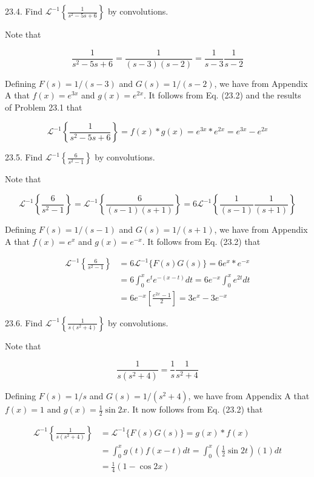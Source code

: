 \documentclass[10pt]{article}
\begin{document}
23.4. Find $\mathscr{L}^{-1}\left\{\frac{1}{s^{2}-5 s+6}\right\}$ by convolutions.

Note that

$$
\frac{1}{s^{2}-5 s+6}=\frac{1}{(s-3)(s-2)}=\frac{1}{s-3} \frac{1}{s-2}
$$

Defining $F(s)=1 /(s-3)$ and $G(s)=1 /(s-2)$, we have from Appendix A that $f(x)=e^{3 x}$ and $g(x)=e^{2 x}$. It follows from Eq. (23.2) and the results of Problem 23.1 that

$$
\mathscr{L}^{-1}\left\{\frac{1}{s^{2}-5 s+6}\right\}=f(x) * g(x)=e^{3 x} * e^{2 x}=e^{3 x}-e^{2 x}
$$

23.5. Find $\mathscr{L}^{-1}\left\{\frac{6}{s^{2}-1}\right\}$ by convolutions.

Note that

$$
\mathscr{L}^{-1}\left\{\frac{6}{s^{2}-1}\right\}=\mathscr{L}^{-1}\left\{\frac{6}{(s-1)(s+1)}\right\}=6 \mathscr{L}^{-1}\left\{\frac{1}{(s-1)} \frac{1}{(s+1)}\right\}
$$

Defining $F(s)=1 /(s-1)$ and $G(s)=1 /(s+1)$, we have from Appendix A that $f(x)=e^{x}$ and $g(x)=e^{-x}$. It follows from Eq. (23.2) that

$$
\begin{aligned}
\mathscr{L}^{-1}\left\{\frac{6}{s^{2}-1}\right\} & =6 \mathscr{L}^{-1}\{F(s) G(s)\}=6 e^{x} * e^{-x} \\
& =6 \int_{0}^{x} e^{t} e^{-(x-t)} d t=6 e^{-x} \int_{0}^{x} e^{2 t} d t \\
& =6 e^{-x}\left[\frac{e^{2 x}-1}{2}\right]=3 e^{x}-3 e^{-x}
\end{aligned}
$$

23.6. Find $\mathscr{L}^{-1}\left\{\frac{1}{s\left(s^{2}+4\right)}\right\}$ by convolutions.

Note that

$$
\frac{1}{s\left(s^{2}+4\right)}=\frac{1}{s} \frac{1}{s^{2}+4}
$$

Defining $F(s)=1 / s$ and $G(s)=1 /\left(s^{2}+4\right)$, we have from Appendix A that $f(x)=1$ and $g(x)=\frac{1}{2} \sin 2 x$. It now follows from Eq. (23.2) that

$$
\begin{aligned}
\mathscr{L}^{-1}\left\{\frac{1}{s\left(s^{2}+4\right)}\right\} & =\mathscr{L}^{-1}\{F(s) G(s)\}=g(x) * f(x) \\
& =\int_{0}^{x} g(t) f(x-t) d t=\int_{0}^{x}\left(\frac{1}{2} \sin 2 t\right)(1) d t \\
& =\frac{1}{4}(1-\cos 2 x)
\end{aligned}
$$
\end{document}
